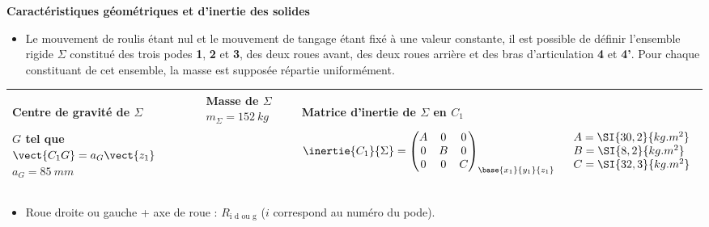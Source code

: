 \textbf{Caractéristiques géométriques et d’inertie des solides}

\begin{itemize}
\item Le mouvement de roulis étant nul et le mouvement de tangage étant fixé à une valeur constante, il est possible de
définir l’ensemble rigide $\Sigma$ constitué des trois podes \textbf{1}, \textbf{2} et \textbf{3}, des deux roues avant, des deux roues arrière et des
bras d’articulation \textbf{4} et \textbf{4’}. Pour chaque constituant de cet ensemble, la masse est supposée répartie
uniformément.
\end{itemize}

\begin{center}
\begin{tabular}{|p{4cm}|p{4cm}|p{8cm}|}
\hline
Centre de gravité de $\Sigma$ 

$G$ tel que $\vect{C_1G}=a_G\vect{z_1}$
$a_G =\SI{85}{mm}$
& 
Masse de $\Sigma$ $m_{\Sigma}=\SI{152}{kg}$
& 
Matrice d'inertie de $\Sigma$ en $C_1$ 

$\inertie{C_1}{\Sigma}=
\begin{pmatrix} 
A & 0 & 0 \\ 0 & B & 0 \\ 0 & 0 & C 
\end{pmatrix}_{\base{x_1}{y_1}{z_1}}
\quad 
\begin{array}{l}
A =\SI{30,2}{kg.m^2} \\
B =\SI{8,2}{kg.m^2} \\
C =\SI{32,3}{kg.m^2} \\
\end{array}$ \\
\hline
\end{tabular}
\end{center}


\begin{itemize}
\item Roue droite ou gauche + axe de roue : $R_{\text{i d ou g}}$ ($i$ correspond au numéro du pode).
\end{itemize}

